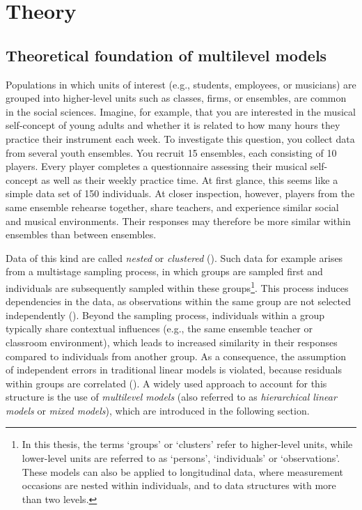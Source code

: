 \documentclass[
  letterpaper,
  11pt,
  english,
  singlespacing,
  headsepline,
  openany]{MastersDoctoralThesis}
\begin{document}

\chapter{Theory}\label{theory}

\section{Theoretical foundation of multilevel
models}\label{theoretical-foundation-of-multilevel-models}

Populations in which units of interest (e.g., students, employees, or
musicians) are grouped into higher-level units such as classes, firms,
or ensembles, are common in the social sciences. Imagine, for example,
that you are interested in the musical self-concept of young adults and
whether it is related to how many hours they practice their instrument
each week. To investigate this question, you collect data from several
youth ensembles. You recruit 15 ensembles, each consisting of 10
players. Every player completes a questionnaire assessing their musical
self-concept as well as their weekly practice time. At first glance,
this seems like a simple data set of 150 individuals. At closer
inspection, however, players from the same ensemble rehearse together,
share teachers, and experience similar social and musical environments.
Their responses may therefore be more similar within ensembles than
between ensembles.

Data of this kind are called \emph{nested} or \emph{clustered}
(). Such data for
example arises from a multistage sampling process, in which groups are
sampled first and individuals are subsequently sampled within these
groups\footnote{In this thesis, the terms `groups' or `clusters' refer
  to higher-level units, while lower-level units are referred to as
  `persons', `individuals' or `observations'. These models can also be
  applied to longitudinal data, where measurement occasions are nested
  within individuals, and to data structures with more than two levels.}.
This process induces dependencies in the data, as observations within
the same group are not selected independently
(). Beyond the
sampling process, individuals within a group typically share contextual
influences (e.g., the same ensemble teacher or classroom environment),
which leads to increased similarity in their responses compared to
individuals from another group. As a consequence, the assumption of
independent errors in traditional linear models is violated, because
residuals within groups are correlated
(). A widely used
approach to account for this structure is the use of \emph{multilevel
models} (also referred to as \emph{hierarchical linear models} or
\emph{mixed models}), which are introduced in the following section.
\end{document}
